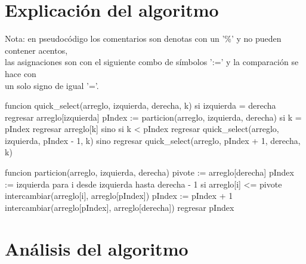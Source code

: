 \documentclass{article}
\begin{document}
\section{Explicación del algoritmo}\label{explicacion}				%
Nota: en pseudocódigo los comentarios son denotas con un '\%' y no pueden contener acentos,\\
las asignaciones son con el siguiente combo de símbolos ':=' y la comparación se hace con\\
un solo signo de igual '='.
\begin{code}
  funcion quick_select(arreglo, izquierda, derecha, k)
    si izquierda = derecha
        regresar arreglo[izquierda]
    pIndex := particion(arreglo, izquierda, derecha)
    si k = pIndex
        regresar arreglo[k]
    sino si k < pIndex
        regresar quick_select(arreglo, izquierda, pIndex - 1, k)
    sino
        regresar quick_select(arreglo, pIndex + 1, derecha, k)

funcion particion(arreglo, izquierda, derecha)
    pivote := arreglo[derecha]
    pIndex := izquierda
    para i desde izquierda hasta derecha - 1
        si arreglo[i] <= pivote
            intercambiar(arreglo[i], arreglo[pIndex])
            pIndex := pIndex + 1
    intercambiar(arreglo[pIndex], arreglo[derecha])
    regresar pIndex
\end{code}

\section{Análisis del algoritmo}\label{AdA}
\end{document}
